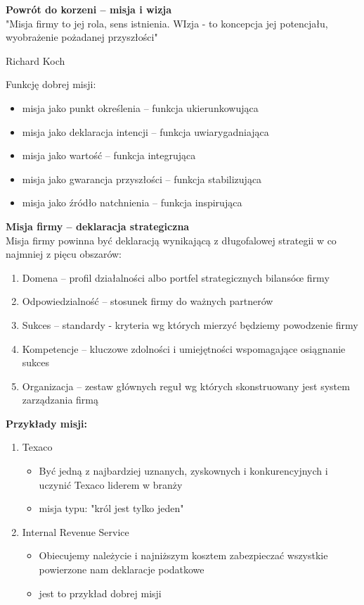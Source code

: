 \documentclass[a4paper,10pt]{report}
\begin{document}
\textbf{Powrót do korzeni -- misja i wizja} \\

"Misja firmy to jej rola, sens istnienia. WIzja - to koncepcja jej potencjału, wyobrażenie pożadanej przyszłości"
\begin{flushright}
Richard Koch
\end{flushright}

Funkcję dobrej misji:
\begin{itemize}
	\item misja jako punkt określenia -- funkcja ukierunkowująca
	\item misja jako deklaracja intencji -- funkcja uwiarygadniająca
	\item misja jako wartość -- funkcja integrująca
	\item misja jako gwarancja przyszłości -- funkcja stabilizująca
	\item misja jako źródło natchnienia -- funkcja inspirująca
\end{itemize}

\textbf{Misja firmy -- deklaracja strategiczna}\\
Misja firmy powinna być deklaracją wynikającą z długofalowej strategii w co najmniej z pięcu obszarów:
\begin{enumerate}
	 \item Domena -- profil działalności albo portfel strategicznych bilansóœ firmy
	 \item Odpowiedzialność -- stosunek firmy do ważnych partnerów
	 \item Sukces -- standardy - kryteria wg których mierzyć będziemy powodzenie firmy
	 \item Kompetencje -- kluczowe zdolności i umiejętności wspomagające osiągnanie sukces
	 \item Organizacja -- zestaw głównych reguł wg których skonstruowany jest system zarządzania firmą
\end{enumerate}

\textbf{Przykłady misji:}
\begin{enumerate}
	\item Texaco
	\begin{itemize}
		\item Być jedną z najbardziej uznanych, zyskownych i konkurencyjnych i uczynić Texaco liderem w branży
		\item misja typu: "król jest tylko jeden" 
	\end{itemize}
	\item Internal Revenue Service
	\begin{itemize}
		\item Obiecujemy należycie i najniższym kosztem zabezpieczać wszystkie powierzone nam deklaracje podatkowe
		\item jest to przykład dobrej misji
	\end{itemize}
\end{enumerate}
\end{document}
